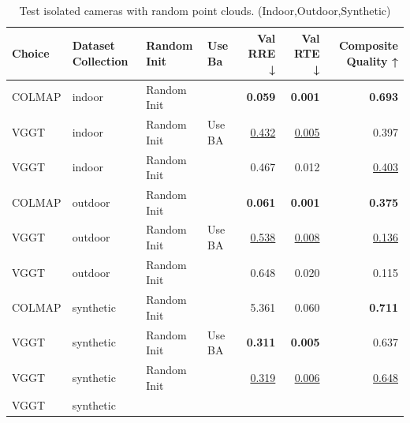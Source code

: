 \begin{table}[H]
\caption{\ifdefined\customcaption \customcaption \else Test isolated cameras with random point clouds. (Indoor,Outdoor,Synthetic) \fi}
\label{tab:06_isolated_cams_indoor,outdoor,synthetic}
\centering
\scriptsize
\begin{tabular}{llllrrr}
\toprule
Choice & Dataset Collection & Random Init & Use Ba & Val RRE ↓ & Val RTE ↓ & Composite Quality ↑ \\
\midrule
COLMAP & indoor & Random Init &  & \textbf{0.059} & \textbf{0.001} & \textbf{0.693} \\
VGGT & indoor & Random Init & Use BA & \underline{0.432} & \underline{0.005} & 0.397 \\
VGGT & indoor & Random Init &  & 0.467 & 0.012 & \underline{0.403} \\
\midrule
COLMAP & outdoor & Random Init &  & \textbf{0.061} & \textbf{0.001} & \textbf{0.375} \\
VGGT & outdoor & Random Init & Use BA & \underline{0.538} & \underline{0.008} & \underline{0.136} \\
VGGT & outdoor & Random Init &  & 0.648 & 0.020 & 0.115 \\
\midrule
COLMAP & synthetic & Random Init &  & 5.361 & 0.060 & \textbf{0.711} \\
VGGT & synthetic & Random Init & Use BA & \textbf{0.311} & \textbf{0.005} & 0.637 \\
VGGT & synthetic & Random Init &  & \underline{0.319} & \underline{0.006} & \underline{0.648} \\
VGGT & synthetic &  &  &  &  &  \\
\bottomrule
\end{tabular}
\end{table}